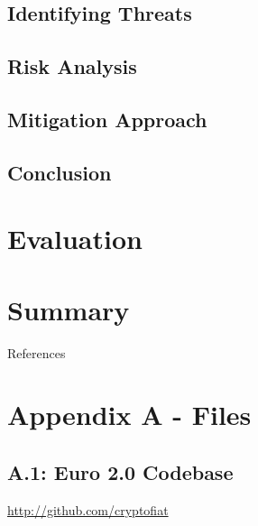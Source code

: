 \documentclass[12pt]{article} %
\begin{document}
{\subsection{Identifying Threats} \label{ssec:5.3}

\subsection{Risk Analysis} \label{ssec:5.4}

\subsection{Mitigation Approach} \label{ssec:5.5}

\subsection{Conclusion} \label{ssec:5.6}

\pagebreak

\section{Evaluation} \label{sec:6}


\pagebreak

\section{Summary} \label{sec:7}


\pagebreak

 \label{sec:refs}
{References}

\pagebreak

\section*{Appendix A - Files} \label{sec:a}

\subsection*{A.1: Euro 2.0 Codebase} \label{ssec:a.1}
\url{http://github.com/cryptofiat}

}
\end{document}
